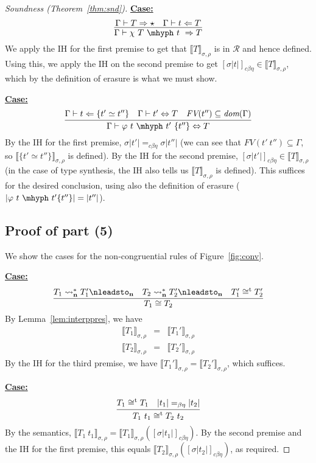 \documentclass{article}
\newcommand{\interp}[1]{\llbracket #1 \rrbracket}
\newcommand{\leadstocs}[0]{\ensuremath{\leadsto_{\mathbf{n}}^*}}
\newcommand{\nleadstoc}[0]{\ensuremath{\nleadsto_{\mathbf{n}}}}
\newcommand{\tpcheck}[0]{\Leftarrow}
\newcommand{\tpsynth}[0]{\Rightarrow}
\newcommand{\cbe}[0]{c\beta\eta}
\newcommand{\startcase}[1]{\vspace{#1} \noindent\textbf{\underline{Case:}}}
\begin{document}
\begin{proof}[Soundness (Theorem~\ref{thm:snd})]
\startcase{.2cm}
\[
  \infer{\Gamma \vdash \chi\ T\ \mhyph\ t\ \tpsynth T}
  {\Gamma \vdash T \tpsynth \star & \Gamma \vdash t \tpcheck T}
\]
We apply the IH for the first premise to get that
$\interp{T}_{\sigma,\rho}$ is in $\mathcal{R}$ and hence defined.
Using this, we apply the IH on the second premise to get \([\sigma|t|]_{\cbe}
\in \interp{T}_{\sigma,\rho}\), which by the definition of erasure is what we
must show.

\startcase{.2cm}
\[
  \infer{\Gamma\vdash \varphi\ t\ \mhyph\ t'\ \{t''\} \Leftrightarrow T}
  {
    \Gamma\vdash t\tpcheck \{t' \simeq t''\}
    & \Gamma\vdash t' \Leftrightarrow T
    & \textit{FV}(t'') \subseteq \textit{dom}(\Gamma)
  }
\]
By the IH for the first premise, $\sigma|t'| =_{\cbe} \sigma|t''|$ (we can see
that \(\textit{FV}(t'\ t'') \subseteq \Gamma\), so \(\interp{\{t' \simeq
  t''\}}_{\sigma,\rho}\) is defined).
By the IH for the second premise,
$[\sigma|t'|]_{\cbe}\in\interp{T}_{\sigma,\rho}$ (in the case of type synthesis,
the IH also tells us \(\interp{T}_{\sigma,\rho}\) is defined).
This suffices for the desired conclusion, using also the definition of erasure
($|\varphi\ t\ \mhyph\ t'\{t''\}| = |t''|$).

\subsection*{Proof of part (5) }
We show the cases for the non-congruential rules of Figure~\ref{fig:conv}.

\startcase{.2cm}
\[
  \infer{
    T_1 \cong T_2
  }{
    T_1 \leadstocs T_1' \nleadstoc
    \quad T_2 \leadstocs T_2' \nleadstoc
    \quad T_1' \cong^{\text{t}} T_2'
  }
\]
By Lemma~\ref{lem:interppres}, we have
\[
\begin{array}{lll}
  \interp{T_1}_{\sigma,\rho} & = & \interp{T_1'}_{\sigma,\rho}\\
  \interp{T_2}_{\sigma,\rho} & = & \interp{T_2'}_{\sigma,\rho}
\end{array}
\]
By the IH for the third premise, we have $\interp{T_1'}_{\sigma,\rho} = \interp{T_2'}_{\sigma,\rho}$,
which suffices.

\startcase{.2cm}
\[
    \infer{T_1\ t_1 \cong^{\text{t}} T_2\ t_2}{T_1 \cong^{\text{t}} T_1 & |t_1| =_{\beta\eta} |t_2|}
\]
By the semantics, $\interp{T_1\ t_1}_{\sigma,\rho} =
\interp{T_1}_{\sigma,\rho}([\sigma|t_1|]_{\cbe})$.  By the second premise
and the IH for the first premise, this equals
$\interp{T_2}_{\sigma,\rho}([\sigma|t_2|]_{\cbe})$, as required.


\end{proof}
\end{document}
